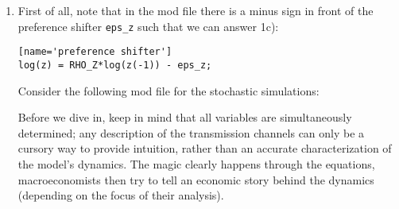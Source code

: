 \begin{enumerate}

\item First of all, note that in the mod file there is a minus sign in front of the preference shifter \texttt{eps\_z} such that we can answer 1c):
\begin{lstlisting}
[name='preference shifter']
log(z) = RHO_Z*log(z(-1)) - eps_z;
\end{lstlisting}

Consider the following mod file for the stochastic simulations:


Before we dive in, keep in mind that all variables are simultaneously determined;
  any description of the transmission channels can only be a cursory way to provide intuition,
  rather than an accurate characterization of the model's dynamics.
The magic clearly happens through the equations, macroeconomists then try to tell an economic story behind the dynamics (depending on the focus of their analysis).
\\

\end{enumerate}

